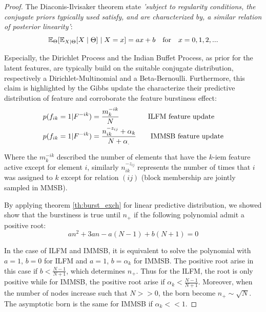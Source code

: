 \begin{proof}
The Diaconis-Ilvisaker theorem \cite{diaconis1979conjugate} state \emph{'subject to regularity conditions, the conjugate priors typically used satisfy, and are characterized by, a  similar relation of posterior linearity'}:
\begin{equation}
\mathbb{E}_\Theta[\mathbb{E}_{X|\Theta}[X\mid \Theta] \mid X=x] = ax+b \quad \textnormal{for} \quad x=0,1,2,... \nonumber
\end{equation}

Especially, the Dirichlet Process and the Indian Buffet Process, as prior for the latent features, are typically build on the suitable conjugate distribution, respectively a Dirichlet-Multinomial and a Beta-Bernoulli. Furthermore, this claim is highlighted by the Gibbs update the characterize their predictive distribution of feature and corroborate the feature burstiness effect:
\begin{align*} 
&p(f_{ik} = 1 | F^{-ik}) = \frac{m_k^{-ik}}{N} \qquad \hspace{20pt} \textnormal{ILFM feature update} \nonumber \\
&p(f_{ik} = 1 | F^{-ik}) = \frac{n_{ik}^{-z_{ij}}+\alpha_k}{N+\alpha_.} \qquad \textnormal{IMMSB feature update} \nonumber \\
\end{align*}

Where the $m_k^{-ik}$ described the number of elements that have the $k$-iem feature active except for element $i$, similarly $n_{ik}^{-z_{ij}}$ represents the number of times that $i$ was assigned to $k$ except for relation $(ij)$ (block membership are jointly sampled in MMSB).

By applying theorem \ref{th:burst_exch} for linear predictive distribution, we showed show that the burstiness is true until $n_+$ if the following polynomial admit a positive root:
\begin{equation*}
	 an^2 + 3an - a(N-1) + b(N+1) = 0
\end{equation*}

    In the case of ILFM and IMMSB, it is equivalent to solve the polynomial with $a=1$, $b=0$ for ILFM and $a=1$, $b=\alpha_k$ for IMMSB. The positive root arise in this case if $b < \frac{N-1}{N+1}$, which determines $n_+$. Thus for the ILFM, the root is only positive while for IMMSB, the positive root arise if $\alpha_k < \frac{N-1}{N+1}$. Moreover, when the number of nodes increase such that $N >> 0$, the born become $n_+ \sim \sqrt{N}$. The asymptotic born is the same for IMMSB if $\alpha_k << 1$.
\end{proof}

